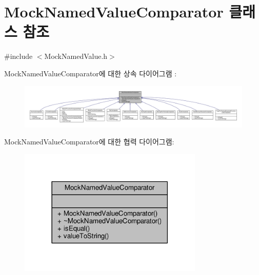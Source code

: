 \hypertarget{class_mock_named_value_comparator}{}\section{Mock\+Named\+Value\+Comparator 클래스 참조}
\label{class_mock_named_value_comparator}


{\ttfamily \#include $<$Mock\+Named\+Value.\+h$>$}



Mock\+Named\+Value\+Comparator에 대한 상속 다이어그램 \+: 
\nopagebreak
\begin{figure}[H]
\begin{center}
\leavevmode
\includegraphics[width=350pt]{class_mock_named_value_comparator__inherit__graph}
\end{center}
\end{figure}


Mock\+Named\+Value\+Comparator에 대한 협력 다이어그램\+:
\nopagebreak
\begin{figure}[H]
\begin{center}
\leavevmode
\includegraphics[width=249pt]{class_mock_named_value_comparator__coll__graph}
\end{center}
\end{figure}
